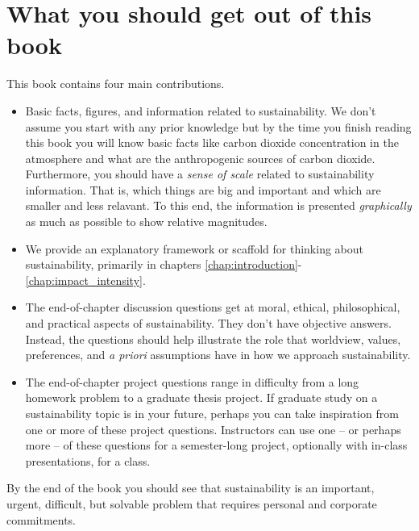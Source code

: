 {\section*{What you should get out of this book} 
This book contains four main contributions.
\begin{itemize}
\item Basic facts, figures, and information related to sustainability. 
We don't assume you start with any prior knowledge but by the time you finish 
reading this book you will know basic facts like carbon dioxide 
concentration in the atmosphere and what are the anthropogenic sources of 
carbon dioxide. 
Furthermore, you should have a \emph{sense of scale} related to sustainability 
information. 
That is, which things are big and important and which are smaller and less relavant. 
To this end, the information is presented \emph{graphically} as much as possible 
to show relative magnitudes.
\item We provide an explanatory framework or scaffold for thinking about sustainability,
primarily in chapters \ref{chap:introduction}-\ref{chap:impact_intensity}.
\item The end-of-chapter discussion questions get at moral, ethical, philosophical,
and practical aspects of sustainability. 
They don't have %
objective answers. 
Instead, the questions should help illustrate the role that worldview, values, 
preferences, and \emph{a priori} assumptions have in how we approach sustainability. 
\item The end-of-chapter project questions range in difficulty from a long
homework problem to a graduate thesis project. 
If graduate study on a sustainability topic is in your future, perhaps you can 
take inspiration from one or more of these project questions. 
Instructors can use one -- or perhaps more -- of these questions for a 
semester-long project, optionally with in-class presentations, for a class.
\end{itemize}
By the end of the book you should see that sustainability is an important, 
urgent, difficult, but solvable problem that requires personal and corporate 
commitments. \\

}
